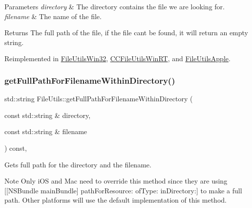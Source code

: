 \begin{DoxyParams}{Parameters}
{\em directory} & The directory contains the file we are looking for. \\
\hline
{\em filename} & The name of the file. \\
\hline
\end{DoxyParams}
\begin{DoxyReturn}{Returns}
The full path of the file, if the file can\textquotesingle{}t be found, it will return an empty string. 
\end{DoxyReturn}


Reimplemented in \hyperlink{classFileUtilsWin32_a32e9d4ce94fa867563c2649bbb6a8416}{File\+Utils\+Win32}, \hyperlink{classCCFileUtilsWinRT_ab72a708f0159e1d0929053540421a2df}{C\+C\+File\+Utils\+Win\+RT}, and \hyperlink{classFileUtilsApple_aebc8f6fdf63b084f39ab0500b179368a}{File\+Utils\+Apple}.

\mbox{\label{classFileUtils_aa6bae4977b0a23b40f5c4dfea7aee3ff}} 
\subsubsection{\texorpdfstring{get\+Full\+Path\+For\+Filename\+Within\+Directory()}{getFullPathForFilenameWithinDirectory()}}
{\footnotesize\ttfamily std\+::string File\+Utils\+::get\+Full\+Path\+For\+Filename\+Within\+Directory (\begin{DoxyParamCaption}\item[{const std\+::string \&}]{directory,  }\item[{const std\+::string \&}]{filename }\end{DoxyParamCaption}) const\hspace{0.3cm}{\ttfamily [protected]}, {\ttfamily [virtual]}}

Gets full path for the directory and the filename.

\begin{DoxyNote}{Note}
Only i\+OS and Mac need to override this method since they are using {\ttfamily \mbox{[}\mbox{[}N\+S\+Bundle main\+Bundle\mbox{]} path\+For\+Resource\+: of\+Type\+: in\+Directory\+:\mbox{]}} to make a full path. Other platforms will use the default implementation of this method. 
\end{DoxyNote}

